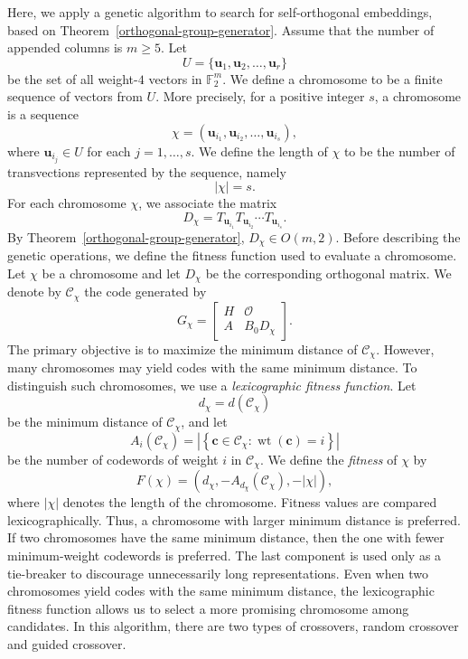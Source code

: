 \documentclass{article}
\begin{document}
Here, we apply a genetic algorithm to search for self-orthogonal embeddings, based on Theorem~\ref{orthogonal-group-generator}. Assume that the number of appended columns is $m\geq 5$. Let
\[
U=\{\mathbf{u}_1,\mathbf{u}_2,\ldots,\mathbf{u}_r\}
\]
be the set of all weight-$4$ vectors in $\mathbb{F}_2^m$.
We define a chromosome to be a finite sequence of vectors from $U$. More precisely, for a positive integer $s$, a chromosome is a sequence
\[
\chi=(\mathbf{u}_{i_1},\mathbf{u}_{i_2},\ldots,\mathbf{u}_{i_s}),
\]
where $\mathbf{u}_{i_j}\in U$ for each $j=1,\ldots,s$. We define the length of $\chi$ to be the number of transvections represented by the sequence, namely
\[
|\chi|=s.
\]
For each chromosome $\chi$, we associate the matrix
\[
D_{\chi}
=
T_{\mathbf{u}_{i_1}}
T_{\mathbf{u}_{i_2}}
\cdots
T_{\mathbf{u}_{i_s}}.
\]
By Theorem~\ref{orthogonal-group-generator}, $D_{\chi}\in O(m,2)$.
Before describing the genetic operations, we define the fitness function used to evaluate a chromosome. Let $\chi$ be a chromosome and let $D_{\chi}$ be the corresponding orthogonal matrix. We denote by $\mathcal{C}_{\chi}$ the code generated by
\[
G_{\chi}=
\begin{bmatrix}
H & \mathcal{O}\\
A & B_0D_{\chi}
\end{bmatrix}.
\]
The primary objective is to maximize the minimum distance of $\mathcal{C}_{\chi}$. However, many chromosomes may yield codes with the same minimum distance. To distinguish such chromosomes, we use a \textit{lexicographic fitness function}. Let
\[
d_{\chi}=d(\mathcal{C}_{\chi})
\]
be the minimum distance of $\mathcal{C}_{\chi}$, and let
\[
A_i(\mathcal{C}_{\chi})
=
\left|\left\{
\mathbf{c}\in \mathcal{C}_{\chi}:\operatorname{wt}(\mathbf{c})=i\right\}\right|
\]
be the number of codewords of weight $i$ in $\mathcal{C}_{\chi}$. We define the \textit{fitness} of $\chi$ by
\[
F(\chi)
=
\left(
d_{\chi},
-A_{d_{\chi}}(\mathcal{C}_{\chi}),
-|\chi|
\right),
\]
where $|\chi|$ denotes the length of the chromosome. Fitness values are compared lexicographically. Thus, a chromosome with larger minimum distance is preferred. If two chromosomes have the same minimum distance, then the one with fewer minimum-weight codewords is preferred. The last component is used only as a tie-breaker to discourage unnecessarily long representations.
Even when two chromosomes yield codes with the same minimum distance, the lexicographic fitness function allows us to select a more promising chromosome among candidates.
In this algorithm, there are two types of crossovers, random crossover and guided crossover.
\end{document}
